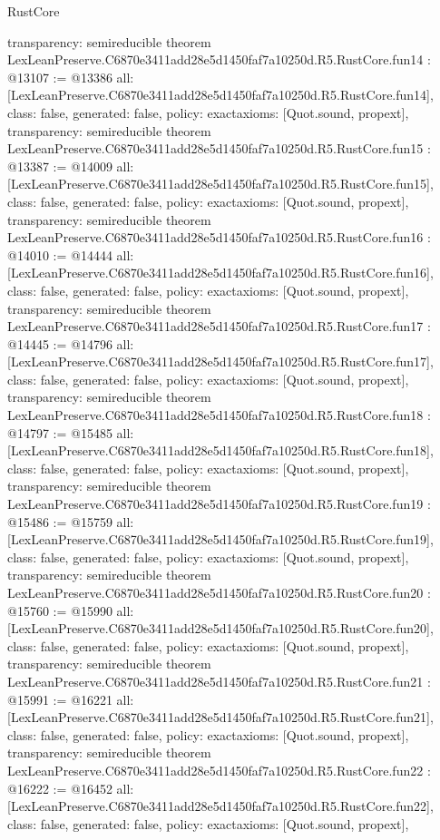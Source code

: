 \begin{lexlean}{RustCore}
\begin{coremodule}
{  transparency: semireducible
}
theorem LexLeanPreserve.C6870e3411add28e5d1450faf7a10250d.R5.RustCore.fun14 : @13107 := @13386 {
  all: [LexLeanPreserve.C6870e3411add28e5d1450faf7a10250d.R5.RustCore.fun14],
  class: false,
  generated: false,
  policy: exact{axioms: [Quot.sound, propext]},
  transparency: semireducible
}
theorem LexLeanPreserve.C6870e3411add28e5d1450faf7a10250d.R5.RustCore.fun15 : @13387 := @14009 {
  all: [LexLeanPreserve.C6870e3411add28e5d1450faf7a10250d.R5.RustCore.fun15],
  class: false,
  generated: false,
  policy: exact{axioms: [Quot.sound, propext]},
  transparency: semireducible
}
theorem LexLeanPreserve.C6870e3411add28e5d1450faf7a10250d.R5.RustCore.fun16 : @14010 := @14444 {
  all: [LexLeanPreserve.C6870e3411add28e5d1450faf7a10250d.R5.RustCore.fun16],
  class: false,
  generated: false,
  policy: exact{axioms: [Quot.sound, propext]},
  transparency: semireducible
}
theorem LexLeanPreserve.C6870e3411add28e5d1450faf7a10250d.R5.RustCore.fun17 : @14445 := @14796 {
  all: [LexLeanPreserve.C6870e3411add28e5d1450faf7a10250d.R5.RustCore.fun17],
  class: false,
  generated: false,
  policy: exact{axioms: [Quot.sound, propext]},
  transparency: semireducible
}
theorem LexLeanPreserve.C6870e3411add28e5d1450faf7a10250d.R5.RustCore.fun18 : @14797 := @15485 {
  all: [LexLeanPreserve.C6870e3411add28e5d1450faf7a10250d.R5.RustCore.fun18],
  class: false,
  generated: false,
  policy: exact{axioms: [Quot.sound, propext]},
  transparency: semireducible
}
theorem LexLeanPreserve.C6870e3411add28e5d1450faf7a10250d.R5.RustCore.fun19 : @15486 := @15759 {
  all: [LexLeanPreserve.C6870e3411add28e5d1450faf7a10250d.R5.RustCore.fun19],
  class: false,
  generated: false,
  policy: exact{axioms: [Quot.sound, propext]},
  transparency: semireducible
}
theorem LexLeanPreserve.C6870e3411add28e5d1450faf7a10250d.R5.RustCore.fun20 : @15760 := @15990 {
  all: [LexLeanPreserve.C6870e3411add28e5d1450faf7a10250d.R5.RustCore.fun20],
  class: false,
  generated: false,
  policy: exact{axioms: [Quot.sound, propext]},
  transparency: semireducible
}
theorem LexLeanPreserve.C6870e3411add28e5d1450faf7a10250d.R5.RustCore.fun21 : @15991 := @16221 {
  all: [LexLeanPreserve.C6870e3411add28e5d1450faf7a10250d.R5.RustCore.fun21],
  class: false,
  generated: false,
  policy: exact{axioms: [Quot.sound, propext]},
  transparency: semireducible
}
theorem LexLeanPreserve.C6870e3411add28e5d1450faf7a10250d.R5.RustCore.fun22 : @16222 := @16452 {
  all: [LexLeanPreserve.C6870e3411add28e5d1450faf7a10250d.R5.RustCore.fun22],
  class: false,
  generated: false,
  policy: exact{axioms: [Quot.sound, propext]},
}
\end{coremodule}
\end{lexlean}

